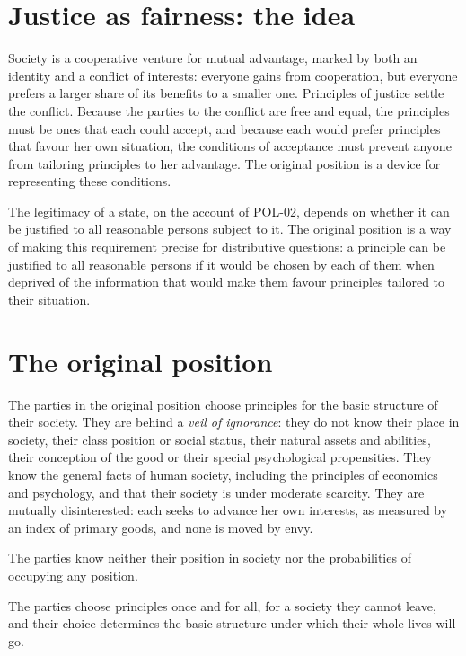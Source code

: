 \documentclass{situationist-preprint}
\begin{document}
\section{Justice as fairness: the idea}

Society is a cooperative venture for mutual advantage, marked by both an identity and a conflict of interests: everyone gains from cooperation, but everyone prefers a larger share of its benefits to a smaller one. Principles of justice settle the conflict. Because the parties to the conflict are free and equal, the principles must be ones that each could accept, and because each would prefer principles that favour her own situation, the conditions of acceptance must prevent anyone from tailoring principles to her advantage. The original position is a device for representing these conditions.

The legitimacy of a state, on the account of POL-02, depends on whether it can be justified to all reasonable persons subject to it. The original position is a way of making this requirement precise for distributive questions: a principle can be justified to all reasonable persons if it would be chosen by each of them when deprived of the information that would make them favour principles tailored to their situation.

\section{The original position}

The parties in the original position choose principles for the basic structure of their society. They are behind a \emph{veil of ignorance}: they do not know their place in society, their class position or social status, their natural assets and abilities, their conception of the good or their special psychological propensities. They know the general facts of human society, including the principles of economics and psychology, and that their society is under moderate scarcity. They are mutually disinterested: each seeks to advance her own interests, as measured by an index of primary goods, and none is moved by envy.

\begin{assumption}\label{a:veil}
The parties know neither their position in society nor the probabilities of occupying any position.
\end{assumption}

\begin{assumption}\label{a:stakes}
The parties choose principles once and for all, for a society they cannot leave, and their choice determines the basic structure under which their whole lives will go.
\end{assumption}
\end{document}
